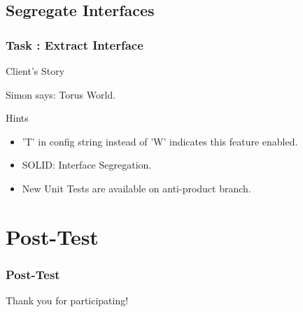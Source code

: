 \documentclass[english]{beamer}
\newenvironment{narrowblock}[1]{%
\begin{center}
\begin{minipage}{10.5cm}
\begin{block}{#1}
}{%
\end{block}
\end{minipage}
\end{center}
}
\begin{document}
\subsection{Segregate Interfaces}

\begin{frame}
\frametitle{Task \thesubsection: Extract Interface}

\begin{narrowblock}{Client's Story}
Simon says: Torus World.
\end{narrowblock}

\pause
\begin{narrowblock}{Hints}
\begin{itemize}[<+->]
\item 'T' in config string instead of 'W' indicates this feature enabled.
\item SOLID: Interface Segregation.
\item New Unit Tests are available on anti-product branch.
\end{itemize}
\end{narrowblock}
\end{frame}

\section{Post-Test}
\begin{frame}
\frametitle{Post-Test}
\end{frame}

\begin{frame}
\begin{center}
Thank you for participating!
\end{center}
\end{frame}
\end{document}
